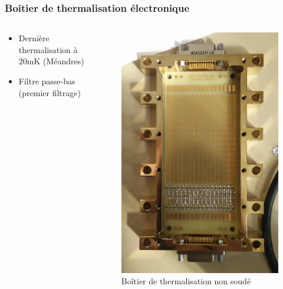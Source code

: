 \documentclass[8pt,a9paper]{beamer} \usepackage[utf8]{inputenc} \usepackage[francais]{babel} \usepackage[T1]{fontenc}
\begin{document}
\begin{frame}
\frametitle{Boîtier de thermalisation électronique}
\begin{columns}
\begin{column}{0.6\textwidth}
    \begin{itemize}
        \item Dernière thermalisation à 20mK (Méandres)
        \vspace*{2mm}
        \item Filtre passe-bas (premier filtrage)
    \end{itemize}
\end{column}
\begin{column}{0.3\textwidth}
\begin{figure}[h]
    \begin{center}
        \includegraphics[width=\textwidth]{Images/Thermalisation/DC3_non_rotate}
        \caption{Boîtier de thermalisation non soudé}
    \end{center}
\end{figure}
\end{column}
\end{columns}

\end{frame}
\end{document}
